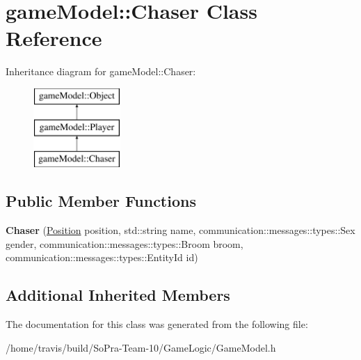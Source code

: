 \hypertarget{classgame_model_1_1_chaser}{\section{game\-Model\-:\-:Chaser Class Reference}
\label{classgame_model_1_1_chaser}
}
Inheritance diagram for game\-Model\-:\-:Chaser\-:\begin{figure}[H]
\begin{center}
\leavevmode
\includegraphics[height=3.000000cm]{classgame_model_1_1_chaser}
\end{center}
\end{figure}
\subsection*{Public Member Functions}
\begin{DoxyCompactItemize}
\item 
\hypertarget{classgame_model_1_1_chaser_a08d2698697ec6327798591f2e095389c}{{\bfseries Chaser} (\hyperlink{structgame_model_1_1_position}{Position} position, std\-::string name, communication\-::messages\-::types\-::\-Sex gender, communication\-::messages\-::types\-::\-Broom broom, communication\-::messages\-::types\-::\-Entity\-Id id)}\label{classgame_model_1_1_chaser_a08d2698697ec6327798591f2e095389c}

\end{DoxyCompactItemize}
\subsection*{Additional Inherited Members}


The documentation for this class was generated from the following file\-:\begin{DoxyCompactItemize}
\item 
/home/travis/build/\-So\-Pra-\/\-Team-\/10/\-Game\-Logic/Game\-Model.\-h\end{DoxyCompactItemize}
